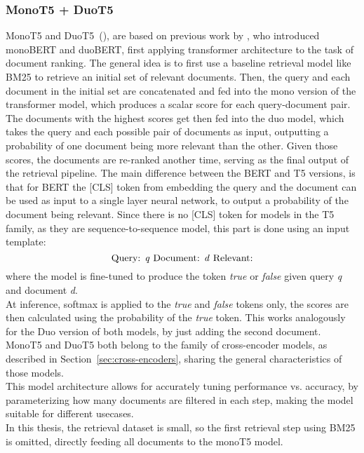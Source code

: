 \subsubsection{MonoT5 + DuoT5}\label{sec:monot5-duot5}
MonoT5 and DuoT5~(\cite{roberts:2019}), are based on previous work by \cite{nogueira:2019}, who introduced monoBERT and duoBERT, first applying transformer architecture to the task of document ranking.
The general idea is to first use a baseline retrieval model like BM25 to retrieve an initial set of relevant documents.
Then, the query and each document in the initial set are concatenated and fed into the mono version of the transformer model, which produces a scalar score for each query-document pair.
The documents with the highest scores get then fed into the duo model, which takes the query and each possible pair of documents as input, outputting a probability of one document being more relevant than the other.
Given those scores, the documents are re-ranked another time, serving as the final output of the retrieval pipeline.
The main difference between the BERT and T5 versions, is that for BERT the [CLS] token from embedding the query and the document can be used as input to a single layer neural network, to output a probability of the document being relevant.
Since there is no [CLS] token for models in the T5 family, as they are sequence-to-sequence model, this part is done using an input template:
\begin{equation}
    \text{Query: \emph{q} Document: \emph{d} Relevant:}
\end{equation} 
where the model is fine-tuned to produce the token \emph{true} or \emph{false} given query \emph{q} and document \emph{d}.
\\
At inference, softmax is applied to the \emph{true} and \emph{false} tokens only, the scores are then calculated using the probability of the \emph{true} token.
This works analogously for the Duo version of both models, by just adding the second document.
MonoT5 and DuoT5 both belong to the family of cross-encoder models, as described in Section~\ref{sec:cross-encoders}, sharing the general characteristics of those models.
\\
This model architecture allows for accurately tuning performance vs. accuracy, by parameterizing how many documents are filtered in each step, making the model suitable for different usecases.
\\
In this thesis, the retrieval dataset is small, so the first retrieval step using BM25 is omitted, directly feeding all documents to the monoT5 model.

